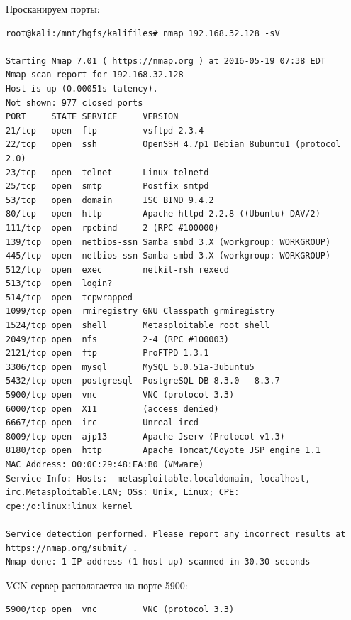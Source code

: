 \documentclass[10pt,a4paper]{report}
\begin{document}
		Просканируем порты:
		\begin{lstlisting}
root@kali:/mnt/hgfs/kalifiles# nmap 192.168.32.128 -sV

Starting Nmap 7.01 ( https://nmap.org ) at 2016-05-19 07:38 EDT
Nmap scan report for 192.168.32.128
Host is up (0.00051s latency).
Not shown: 977 closed ports
PORT     STATE SERVICE     VERSION
21/tcp   open  ftp         vsftpd 2.3.4
22/tcp   open  ssh         OpenSSH 4.7p1 Debian 8ubuntu1 (protocol 2.0)
23/tcp   open  telnet      Linux telnetd
25/tcp   open  smtp        Postfix smtpd
53/tcp   open  domain      ISC BIND 9.4.2
80/tcp   open  http        Apache httpd 2.2.8 ((Ubuntu) DAV/2)
111/tcp  open  rpcbind     2 (RPC #100000)
139/tcp  open  netbios-ssn Samba smbd 3.X (workgroup: WORKGROUP)
445/tcp  open  netbios-ssn Samba smbd 3.X (workgroup: WORKGROUP)
512/tcp  open  exec        netkit-rsh rexecd
513/tcp  open  login?
514/tcp  open  tcpwrapped
1099/tcp open  rmiregistry GNU Classpath grmiregistry
1524/tcp open  shell       Metasploitable root shell
2049/tcp open  nfs         2-4 (RPC #100003)
2121/tcp open  ftp         ProFTPD 1.3.1
3306/tcp open  mysql       MySQL 5.0.51a-3ubuntu5
5432/tcp open  postgresql  PostgreSQL DB 8.3.0 - 8.3.7
5900/tcp open  vnc         VNC (protocol 3.3)
6000/tcp open  X11         (access denied)
6667/tcp open  irc         Unreal ircd
8009/tcp open  ajp13       Apache Jserv (Protocol v1.3)
8180/tcp open  http        Apache Tomcat/Coyote JSP engine 1.1
MAC Address: 00:0C:29:48:EA:B0 (VMware)
Service Info: Hosts:  metasploitable.localdomain, localhost, irc.Metasploitable.LAN; OSs: Unix, Linux; CPE: cpe:/o:linux:linux_kernel

Service detection performed. Please report any incorrect results at https://nmap.org/submit/ .
Nmap done: 1 IP address (1 host up) scanned in 30.30 seconds

		\end{lstlisting}
		
		VCN сервер располагается на порте 5900:
		\begin{lstlisting}
5900/tcp open  vnc         VNC (protocol 3.3)
		\end{lstlisting}
		
\end{document}
